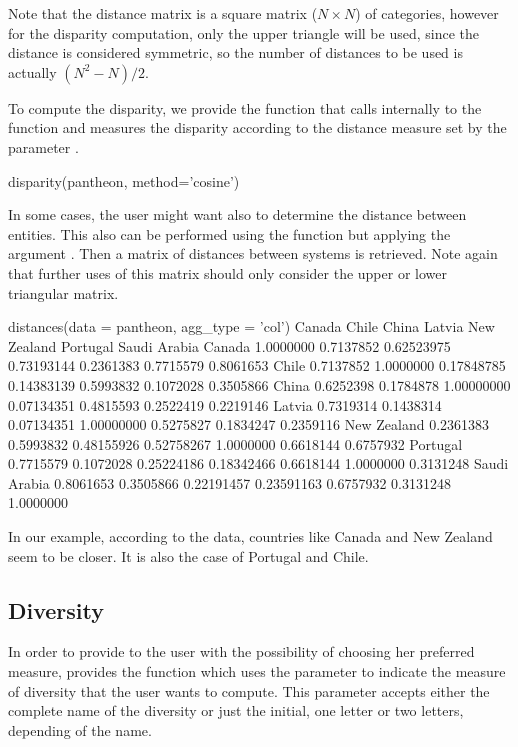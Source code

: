 Note that the distance matrix is a square matrix ($N \times N$) of categories, however for the disparity computation, only the upper triangle will be used, since the distance is considered symmetric, so the number of distances to be used is actually $\left(N^2 - N\right)/2$.
 
To compute the disparity, we provide the function  that calls internally to the function  and measures the disparity according to the distance measure set by the parameter .

\begin{example}
   disparity(pantheon, method='cosine')
\end{example}


In some cases, the user might want also to determine the distance between entities. This also can be performed using the function  but applying the argument . Then a matrix of distances between systems is retrieved. Note again that further uses of this matrix should only consider the upper or lower triangular matrix.

\begin{example}
  distances(data = pantheon, agg_type = 'col')
                Canada     Chile      China     Latvia New Zealand  Portugal Saudi Arabia
Canada       1.0000000 0.7137852 0.62523975 0.73193144   0.2361383 0.7715579    0.8061653
Chile        0.7137852 1.0000000 0.17848785 0.14383139   0.5993832 0.1072028    0.3505866
China        0.6252398 0.1784878 1.00000000 0.07134351   0.4815593 0.2522419    0.2219146
Latvia       0.7319314 0.1438314 0.07134351 1.00000000   0.5275827 0.1834247    0.2359116
New Zealand  0.2361383 0.5993832 0.48155926 0.52758267   1.0000000 0.6618144    0.6757932
Portugal     0.7715579 0.1072028 0.25224186 0.18342466   0.6618144 1.0000000    0.3131248
Saudi Arabia 0.8061653 0.3505866 0.22191457 0.23591163   0.6757932 0.3131248    1.0000000
\end{example}

In our example, according to the data, countries like Canada and New Zealand seem to be closer. It is also the case of  Portugal and Chile.

\subsection{Diversity}\label{sec:diversity}
In order to provide to the user with the possibility of choosing her preferred measure,  provides the function  which uses the parameter  to indicate the measure of diversity that the user wants to compute. This parameter accepts either the complete name of the diversity or just the initial, one letter or two letters, depending of the name. 

